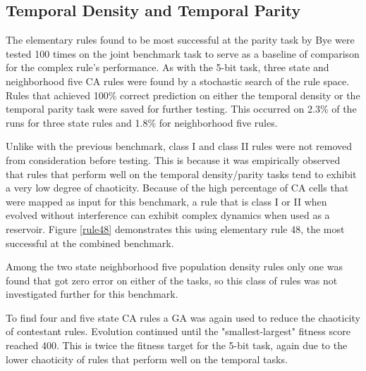 \documentclass{elsarticle}
\begin{document}
\begin{multicols}{2}
\subsection{Temporal Density and Temporal Parity}
  The elementary rules found to be most successful at the parity task by Bye 
     were tested 100 times on the joint benchmark task to serve as a baseline 
     of comparison for the complex rule's performance. As with the 5-bit task, 
        three state and neighborhood five CA rules were found by a stochastic 
           search of the rule space. Rules that achieved 100\% correct 
           prediction on either the temporal density or the temporal parity 
           task were saved for further testing. This occurred on 2.3\% of the 
           runs for three state rules and 1.8\% for neighborhood five rules.  
           \par  Unlike with the previous benchmark, class I and class II rules 
           were not removed from consideration before testing.  This is because 
           it was empirically observed that rules that perform well on the 
           temporal density/parity tasks tend to exhibit a very low degree of 
           chaoticity. Because of the high percentage of CA cells that were 
           mapped as input for this benchmark, a rule that is class I or II 
           when evolved without interference can exhibit complex dynamics when 
           used as a reservoir.  Figure \ref{rule48} demonstrates this using 
           elementary rule 48, the most successful at the combined benchmark.  
           \par Among the two state neighborhood five population density rules 
           only one was found that got zero error on either of the tasks, so 
           this class of rules was not investigated further for this benchmark.  
           \par To find four and five state CA rules a GA was again used to 
           reduce the chaoticity of contestant rules. Evolution continued until 
           the "smallest-largest" fitness score reached 400. This is twice the 
           fitness target for the 5-bit task, again due to the lower chaoticity 
           of rules that perform well on the temporal tasks.



\end{multicols}
\end{document}

